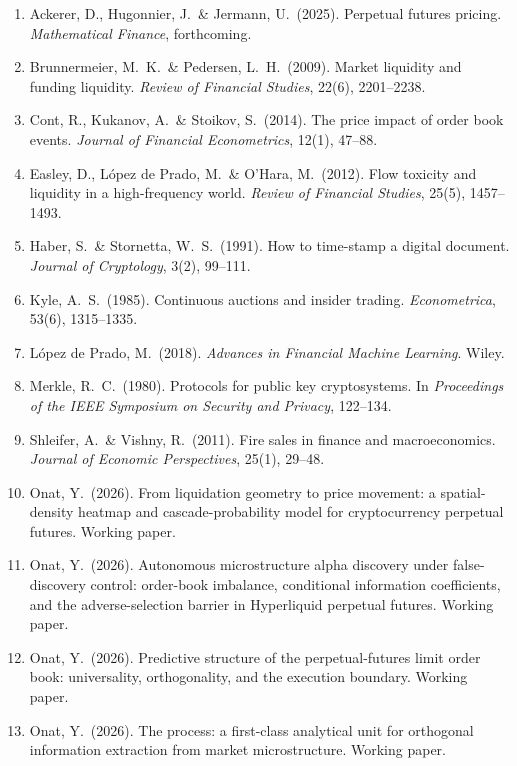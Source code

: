 \documentclass[11pt,a4paper]{article}
\theoremstyle{definition}
\theoremstyle{plain}
\begin{document}
\begin{enumerate}
    \item Ackerer, D., Hugonnier, J.\ \& Jermann, U.\ (2025). Perpetual
          futures pricing. \textit{Mathematical Finance}, forthcoming.

    \item Brunnermeier, M.\ K.\ \& Pedersen, L.\ H.\ (2009). Market liquidity and funding
          liquidity. \textit{Review of Financial Studies}, 22(6), 2201--2238.

    \item Cont, R., Kukanov, A.\ \& Stoikov, S.\ (2014). The price impact of order book
          events. \textit{Journal of Financial Econometrics}, 12(1), 47--88.

    \item Easley, D., L\'opez de Prado, M.\ \& O'Hara, M.\ (2012). Flow toxicity and
          liquidity in a high-frequency world. \textit{Review of Financial Studies}, 25(5),
          1457--1493.

    \item Haber, S.\ \& Stornetta, W.\ S.\ (1991). How to time-stamp a
          digital document. \textit{Journal of Cryptology}, 3(2), 99--111.

    \item Kyle, A.\ S.\ (1985). Continuous auctions and insider trading.
          \textit{Econometrica}, 53(6), 1315--1335.

    \item L\'opez de Prado, M.\ (2018). \textit{Advances in Financial
          Machine Learning}. Wiley.

    \item Merkle, R.\ C.\ (1980). Protocols for public key cryptosystems.
          In \textit{Proceedings of the IEEE Symposium on Security and Privacy}, 122--134.

    \item Shleifer, A.\ \& Vishny, R.\ (2011). Fire sales in finance and macroeconomics.
          \textit{Journal of Economic Perspectives}, 25(1), 29--48.

    \item Onat, Y.\ (2026). From liquidation geometry to price movement:
          a spatial-density heatmap and cascade-probability model for cryptocurrency perpetual
          futures. Working paper.

    \item Onat, Y.\ (2026). Autonomous microstructure alpha discovery under
          false-discovery control: order-book imbalance, conditional information coefficients, and
          the adverse-selection barrier in Hyperliquid perpetual futures. Working paper.

    \item Onat, Y.\ (2026). Predictive structure of the perpetual-futures
          limit order book: universality, orthogonality, and the execution boundary. Working paper.

    \item Onat, Y.\ (2026). The process: a first-class analytical unit for
          orthogonal information extraction from market microstructure. Working paper.
\end{enumerate}
\end{document}
